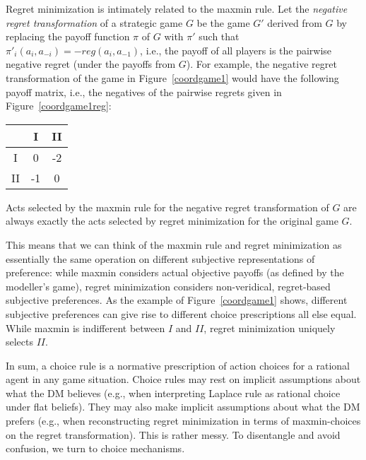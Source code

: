 \documentclass[fleqn,reqno,11pt]{article}
\begin{document}

  

Regret minimization is intimately related to the maxmin rule. Let the \emph{negative regret
  transformation} of a strategic game $G$ be the game $G'$ derived from $G$ by replacing the payoff
function $\pi$ of $G$ with $\pi'$ such that $\pi'_i(a_i, a_{-i}) = - reg(a_i,a_{-1})$, i.e.,
the payoff of all players is the pairwise negative regret (under the payoffs from $G$). For
example, the negative regret transformation of the game in Figure~\ref{coordgame1} would have the
following payoff matrix, i.e., the negatives of the pairwise regrets given in
Figure~\ref{coordgame1reg}:

\begin{center}
    \begin{tabular}{ccc}
      \toprule
      & I & II \\
      \midrule
      I & 0 & -2 \\
      II & -1 & 0\\
      \bottomrule
    \end{tabular}
\end{center}

\noindent Acts selected by the maxmin rule for the negative regret transformation of $G$ are
always exactly the acts selected by regret minimization for the original game $G$.

This means that we can think of the maxmin rule and regret minimization as essentially the
same operation on different subjective representations of preference: while maxmin considers
actual objective payoffs (as defined by the modeller's game), regret minimization considers
non-veridical, regret-based subjective preferences. As the example of Figure~\ref{coordgame1}
shows, different subjective preferences can give rise to different choice prescriptions all
else equal. While maxmin is indifferent between $I$ and $II$, regret minimization uniquely
selects $II$.

In sum, a choice rule is a normative prescription of action choices for a rational agent in any
game situation. Choice rules may rest on implicit assumptions about what the DM believes (e.g.,
when interpreting Laplace rule as rational choice under flat beliefs). They may also make
implicit assumptions about what the DM prefers (e.g., when reconstructing regret minimization
in terms of maxmin-choices on the regret transformation). This is rather messy. To disentangle
and avoid confusion, we turn to choice mechanisms.
\end{document}
